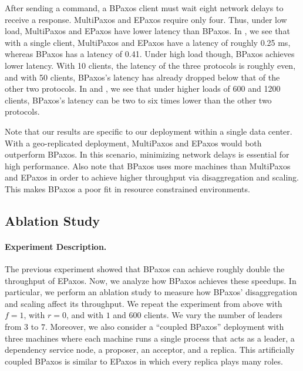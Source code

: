 After sending a command, a BPaxos client must wait eight network delays to
receive a response. MultiPaxos and EPaxos require only four. Thus, under low
load, MultiPaxos and EPaxos have lower latency than BPaxos. In
, we see that with a single client, MultiPaxos and EPaxos
have a latency of roughly 0.25 ms, whereas BPaxos has a latency of 0.41. Under
high load though, BPaxos achieves lower latency. With 10 clients, the latency
of the three protocols is roughly even, and with 50 clients, BPaxos's latency
has already dropped below that of the other two protocols. In 
and , we see that under higher loads of 600 and 1200 clients,
BPaxos's latency can be two to six times lower than the other two protocols.

Note that our results are specific to our deployment within a single data
center. With a geo-replicated deployment, MultiPaxos and EPaxos would both
outperform BPaxos. In this scenario, minimizing network delays is essential for
high performance.
%
Also note that BPaxos uses more machines than MultiPaxos and EPaxos in
order to achieve higher throughput via disaggregation and scaling. This makes
BPaxos a poor fit in resource constrained environments.

\subsection{Ablation Study}
{}

\paragraph{Experiment Description.}
The previous experiment showed that BPaxos can achieve roughly double the
throughput of EPaxos. Now, we analyze how BPaxos achieves these speedups. In
particular, we perform an ablation study to measure how BPaxos' disaggregation
and scaling affect its throughput. We repeat the experiment from above with
$f=1$, with $r=0$, and with $1$ and $600$ clients. We vary the number of
leaders from $3$ to $7$. Moreover, we also consider a ``coupled BPaxos''
deployment with three machines where each machine runs a single process that
acts as a leader, a dependency service node, a proposer, an acceptor, and a
replica. This artificially coupled BPaxos is similar to EPaxos in which every
replica plays many roles.


